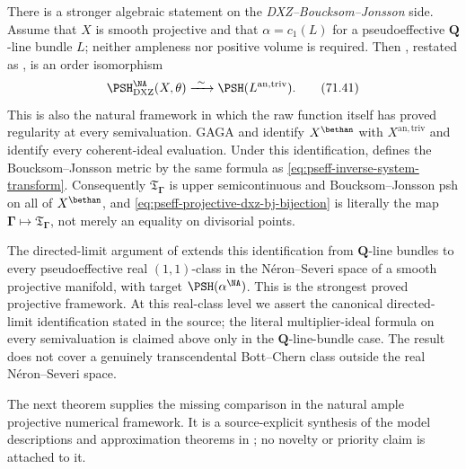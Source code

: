 There is a stronger algebraic statement on the
\emph{DXZ--Boucksom--Jonsson} side.  Assume that \(X\) is smooth
projective and that
\(\alpha=c_1(L)\) for a pseudoeffective \(\mathbf Q\)-line bundle \(L\);
neither ampleness nor positive volume is required.  Then
\cite[Theorem~3.14]{DXZ23}, restated as , is an order
isomorphism
\[
 \PSH^{\NA}_{\mathrm{DXZ}}(X,\theta)
 \xrightarrow{\ \sim\ }
 \PSH(L^{\mathrm{an,triv}}).
\tag{71.41}\label{eq:pseff-projective-dxz-bj-bijection}
\]
This is also the natural framework in which the raw function itself has
proved regularity at every semivaluation.  GAGA and
 identify
\(X^{\bethan}\) with \(X^{\mathrm{an,triv}}\) and identify every
coherent-ideal evaluation.  Under this identification,
\cite[formula~(3.8) and Theorem~3.12]{Xia23Operations} defines the
Boucksom--Jonsson metric by the same formula as
\eqref{eq:pseff-inverse-system-transform}.  Consequently
\(\mathfrak T_{\boldsymbol\Gamma}\) is upper semicontinuous and
Boucksom--Jonsson psh on all of \(X^{\bethan}\), and
\eqref{eq:pseff-projective-dxz-bj-bijection} is literally the map
\(\boldsymbol\Gamma\mapsto\mathfrak T_{\boldsymbol\Gamma}\), not merely
an equality on divisorial points.

The directed-limit argument of
\cite[Remark~3.15]{DXZ23} extends this identification from
\(\mathbf Q\)-line bundles to every pseudoeffective real
\((1,1)\)-class in the N\'eron--Severi space of a smooth projective
manifold, with target
\(\PSH(\alpha^{\NA})\).  This is the strongest proved projective
framework.  At this real-class level we assert the canonical
directed-limit identification stated in the source; the literal
multiplier-ideal formula on every semivaluation is claimed above only in
the \(\mathbf Q\)-line-bundle case.  The result does not cover a genuinely
transcendental Bott--Chern class outside the real N\'eron--Severi space.

The next theorem supplies the missing comparison in the natural ample
projective numerical framework.  It is a source-explicit synthesis of the
model descriptions and approximation theorems in
\cite{MP24,BJ22,DXZ23}; no novelty or priority claim is attached to it.

